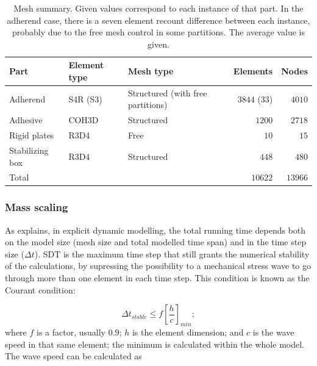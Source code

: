 \documentclass[
documentsize = a4, %
font = cmr, %
typesize = 11, %
printmode = true,
onehalfspacing = true,
language = en, %
titlepage = udciccp, %
degree = pt, %
dedication = true,
acknowledgements = true,
abstract-en = true,
abstract-es = false,
abstract-ga = false,
epigraphs = true,
toc = true,
lof = true,
lot = true,
frontmatterintoc = false,
notation = false,
minimal = false,
]{UDCthesis}
\begin{document}
\begin{table}
	\centering
	\begin{tabular}{ll p{3cm} rr}

		\toprule

		Part & Element type & Mesh type & Elements & Nodes \\

		\midrule

		Adherend & S4R (S3) & Structured (with free partitions) & $3844$ ($33$) & $4010$ \\
		Adhesive & COH3D & Structured & $1200$ & $2718$ \\
		Rigid plates & R3D4 & Free & $10$ & $15$ \\
		Stabilizing box & R3D4 & Structured & $448$ & $480$ \\

		\midrule

		Total &&& $10622$ & $13966$ \\

		\bottomrule

	\end{tabular}
	\caption[Mesh summary.]{Mesh summary. Given values correspond to each instance of that part. In the adherend case, there is a seven element recount difference between each instance, probably due to the free mesh control in some partitions. The average value is given.}
	\label{tab:mesh}
\end{table}

\subsubsection{Mass scaling}
\label{sec:mass_scaling}

As \citet{Hale} explains, in explicit dynamic modelling, the total running time depends both on the model size (mesh size and total modelled time span) and in the time step size (${\Delta}t$). \Acrfull{SDT} is the maximum time step that still grants the numerical stability of the calculations, by supressing the possibility to a mechanical stress wave to go through more than one element in each time step. This condition is known as the Courant condition:

\begin{equation}
{\Delta}t_{stable} \leq f \left[\frac{h}{c}\right]_{min} ;
\label{eq:courant}
\end{equation}
where $f$ is a factor, usually $0.9$; $h$ is the element dimension; and $c$ is the wave speed in that same element; the minimum is calculated within the whole model. The wave speed can be calculated as
\end{document}
